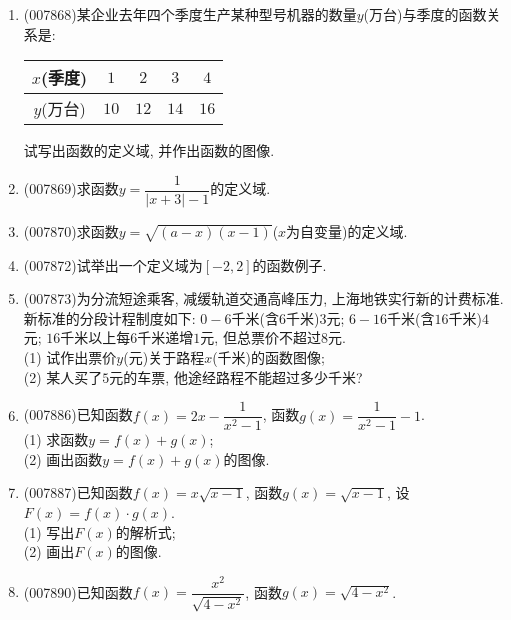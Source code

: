 \documentclass[10pt,a4paper]{article}
\begin{document}
\begin{enumerate}[1.]
\begin{center}
\end{center}
\item {\tiny (007868)}某企业去年四个季度生产某种型号机器的数量$y$(万台)与季度的函数关系是:
\begin{center}
    \begin{tabular}{|c|c|c|c|c|}
        \hline
        $x$(季度) & $1$ & $2$ & $3$ & $4$\\ \hline
        $y$(万台) & $10$ & $12$ & $14$ & $16$\\ \hline
    \end{tabular}
\end{center}
试写出函数的定义域, 并作出函数的图像.
\item {\tiny (007869)}求函数$y=\dfrac 1{|x+3|-1}$的定义域.
\item {\tiny (007870)}求函数$y=\sqrt {(a-x)(x-1)}$($x$为自变量)的定义域.
\item {\tiny (007872)}试举出一个定义域为$[-2,2]$的函数例子.
\item {\tiny (007873)}为分流短途乘客, 减缓轨道交通高峰压力, 上海地铁实行新的计费标准. 新标准的分段计程制度如下: $0-6$千米(含$6$千米)$3$元; $6-16$千米(含$16$千米)$4$元; $16$千米以上每$6$千米递增$1$元, 但总票价不超过$8$元.\\
(1) 试作出票价$y$(元)关于路程$x$(千米)的函数图像;\\
(2) 某人买了$5$元的车票, 他途经路程不能超过多少千米?
\item {\tiny (007886)}已知函数$f(x)=2x-\dfrac 1{x^2-1}$, 函数$g(x)=\dfrac 1{x^2-1}-1$.\\
(1) 求函数$y=f(x)+g(x)$;\\
(2) 画出函数$y=f(x)+g(x)$的图像.
\item {\tiny (007887)}已知函数$f(x)=x\sqrt {x-1}$, 函数$g(x)=\sqrt {x-1}$, 设$F(x)=f(x)\cdot g(x)$.\\
(1) 写出$F(x)$的解析式;\\
(2) 画出$F(x)$的图像.
\item {\tiny (007890)}已知函数$f(x)=\dfrac{x^2}{\sqrt {4-{x^2}}}$, 函数$g(x)=\sqrt {4-x^2}$.\\

\end{enumerate}
\end{document}
